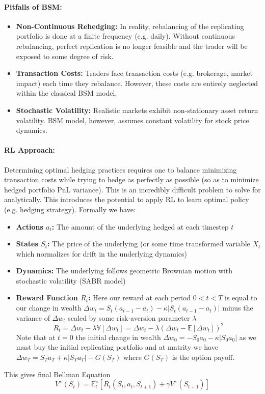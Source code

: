 \documentclass{article}
\begin{document}
\paragraph{Pitfalls of BSM:}
\begin{itemize}
    \item \textbf{Non-Continuous Rehedging:} In reality, rebalancing of the replicating portfolio is done at a finite frequency (e.g. daily). Without continuous rebalancing, perfect replication is no longer feasible and the trader will be exposed to some degree of risk.
    \item \textbf{Transaction Costs:} Traders face transaction costs (e.g. brokerage, market impact) each time they rebalance. However, these costs are entirely neglected within the classical BSM model.
    \item \textbf{Stochastic Volatility:} Realistic markets exhibit non-stationary asset return volatility. BSM model, however, assumes constant volatility for stock price dynamics.
\end{itemize}

\paragraph{RL Approach:} Determining optimal hedging practices requires one to balance minimizing transaction costs while trying to hedge as perfectly as possible (so as to minimize hedged portfolio PnL variance). This is an incredibly difficult problem to solve for analytically. This introduces the potential to apply RL to learn optimal policy (e.g. hedging strategy). Formally we have:
\begin{itemize}
    \item \textbf{Actions $a_t$:} The amount of the underlying hedged at each timestep $t$
    \item \textbf{States $S_t$:} The price of the underlying (or some time transformed variable $X_t$ which normalizes for drift in the underlying dynamics)
    \item \textbf{Dynamics:} The underlying follows geometric Brownian motion with stochastic volatility (SABR model)
    \item \textbf{Reward Function $R_t$:}
    Here our reward at each period $0<t<T$ is equal to our change in wealth $\Delta w_t = S_t(a_{t-1}-a_t)-\kappa|S_t(a_{t-1}-a_t)|$ minus the variance of $\Delta w_t$ scaled by some risk-aversion parameter $\lambda$
    \[R_t = \Delta w_t - \lambda\mathbb{V}[\Delta w_t] = \Delta w_t - \lambda(\Delta w_t-\mathbb{E}[\Delta w_t])^2\]
    Note that at $t=0$ the initial change in wealth $\Delta w_0=-S_0a_0-\kappa |S_0a_0|$ as we must buy the initial replicating portfolio and at matrity we have  $\Delta w_T=S_Ta_T+\kappa |S_Ta_T|-G(S_T)$ where $G(S_T)$ is the option payoff.
\end{itemize}
This gives final Bellman Equation \[V^{\pi}(S_t) = \mathbb{E}^{\pi}_t[R_t(S_t,a_t,S_{t+1})+\gamma V^{\pi}(S_{t+1})]\]
\end{document}
